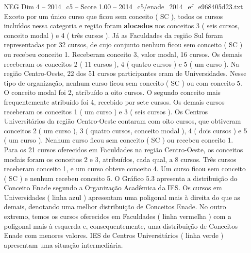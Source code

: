 \begin{textsample}{NEG Dim 4 – 2014\_c5 – Score 1.00 – 2014\_c5/enade\_2014\_ef\_e968405d23.txt}
Exceto por um único curso que ficou sem conceito ( SC ), todos os cursos incluídos nessa categoria e região foram \textbf{alocados} nos conceitos 3 ( seis cursos, conceito modal ) e 4 ( três cursos ).
Já as Faculdades da região Sul foram representadas por 32 cursos, de cujo conjunto nenhum ficou sem conceito ( SC ) ou recebeu conceito 1.
Receberam conceito 3, valor modal, 16 cursos.
Os demais receberam os conceitos 2 ( 11 cursos ), 4 ( quatro cursos ) e 5 ( um curso ).
Na região Centro-Oeste, 22 dos 51 cursos participantes eram de Universidades.
Nesse tipo de organização, nenhum curso ficou sem conceito ( SC ) ou com conceito 5.
O conceito modal foi 2, atribuído a oito cursos.
O segundo conceito mais frequentemente atribuído foi 4, recebido por sete cursos.
Os demais cursos receberam os conceitos 1 ( um curso ) e 3 ( seis cursos ).
Os Centros Universitários da região Centro-Oeste contaram com oito cursos, que obtiveram conceitos 2 ( um curso ), 3 ( quatro cursos, conceito modal ), 4 ( dois cursos ) e 5 ( um curso ).
Nenhum curso ficou sem conceito ( SC ) ou recebeu conceito 1.
Para os 21 cursos oferecidos em Faculdades na região Centro-Oeste, os conceitos modais foram os conceitos 2 e 3, atribuídos, cada qual, a 8 cursos.
Três cursos receberam conceito 1, e um curso obteve conceito 4.
Um curso ficou sem conceito ( SC ) e nenhum recebeu conceito 5.
O Gráfico 5.3 apresenta a distribuição do Conceito Enade segundo a Organização Acadêmica da IES.
Os cursos em Universidades ( linha azul ) apresentam uma poligonal mais à direita do que as demais, denotando uma melhor distribuição de Conceitos Enade.
No outro extremo, temos os cursos oferecidos em Faculdades ( linha vermelha ) com a poligonal mais à esquerda e, consequentemente, uma distribuição de Conceitos Enade com menores valores.
IES de Centros Universitários ( linha verde ) apresentam uma situação intermediária.

\end{textsample}
